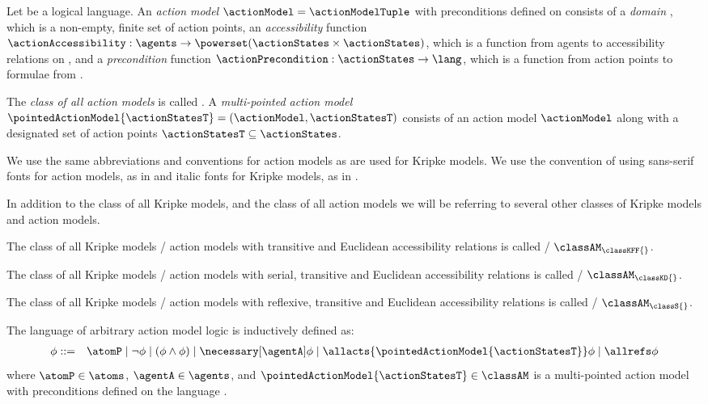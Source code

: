 \documentclass[twoside]{aiml14}
\begin{document}
  \begin{definition}\label{action-model}
  Let \lang{} be a logical language.
  An {\em action model} $\actionModel = \actionModelTuple$ with preconditions defined
  on \lang{} consists of a {\em domain} \actionStates, 
  which is a non-empty, finite set of action points, 
  an {\em accessibility} function $\actionAccessibility : \agents \to \powerset(\actionStates \times \actionStates)$,
  which is a function from agents to accessibility relations on \actionStates, 
  and a {\em precondition} function $\actionPrecondition : \actionStates \to \lang$,
  which is a function from action points to formulae from \lang{}.

  The {\em class of all action models} is called \classAM{}.
  A {\em multi-pointed action model}
  $\pointedActionModel{\actionStatesT} = (\actionModel, \actionStatesT)$
  consists of an action model $\actionModel$ along with a designated set of
  action points $\actionStatesT \subseteq \actionStates$.
  \end{definition}

  We use the same abbreviations and conventions for action models as are used
  for Kripke models. We use the convention of using sans-serif fonts for action
  models, as in \pointedActionModel{\actionStatesT} and italic fonts for Kripke
  models, as in \pointedModel{\statesT}.

  In addition to the class \classK{} of all Kripke models, 
  and the class \classAM{} of all action models 
  we will be referring to several other classes of Kripke models and action models.

  \begin{definition}
      The class of all Kripke models / action models with transitive and Euclidean accessibility relations is called \classKFF{} / $\classAM_\classKFF{}$.

      The class of all Kripke models / action models with serial, transitive and Euclidean accessibility relations is called \classKD{} / $\classAM_\classKD{}$.

      The class of all Kripke models / action models with reflexive, transitive and Euclidean accessibility relations is called \classS{} / $\classAM_\classS{}$.
  \end{definition}

  \begin{definition}\label{aml-syntax}
  The language \langAaml{} of arbitrary action model logic is inductively defined as:
  \begin{eqnarray*}
      \phi &::=& \atomP \mid 
             \neg \phi \mid
             (\phi \land \phi) \mid
             \necessary[\agentA] \phi \mid
             \allacts{\pointedActionModel{\actionStatesT}} \phi \mid
             \allrefs \phi
  \end{eqnarray*}
  where $\atomP \in \atoms$, $\agentA \in \agents$, and
  $\pointedActionModel{\actionStatesT} \in \classAM$ is a multi-pointed action
  model with preconditions defined on the language \langAaml{}.
  \end{definition}
\end{document}
